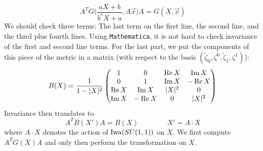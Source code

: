 \begin{equation*}
	A^T G\bigg(\frac{a X+b}{b^* X+a}, A\vec x \bigg) A=G(X,\vec x)
\end{equation*}
We should check three terms: The last term on the first line, the second line, and the third plus fourth lines. Using \texttt{Mathematica}, it is not hard to check invariance of the first and second line terms. For the last part, we put the components of this piece of the metric in a matrix (with respect to the basis $(\tilde\zeta_0,\zeta^0,\tilde\zeta_1,\zeta^1)$):
\begin{equation*}
	B(X)=
	\frac{1}{1-\lvert X \rvert^2}
	\begin{pmatrix}
		1 & 0 & \operatorname{Re} X & \operatorname{Im} X \\ 
		0 & 1 & \operatorname{Im} X & -\operatorname{Re} X\\
		\operatorname{Re} X & \operatorname{Im} X & \lvert X \rvert^2 & 0 \\
		\operatorname{Im} X & -\operatorname{Re} X & 0 & \lvert X \rvert^2
	\end{pmatrix}
\end{equation*}
Invariance then translates to 
\begin{equation*}
	A^TB(X')A=B(X) \qquad \qquad 
	X'=A\cdot X
\end{equation*}
where $A\cdot X$ denotes the action of $\operatorname{Iwa}(SU(1,1))$ on $X$. We first compute $A^TG(X)A$ and only then perform the transformation on $X$. 

